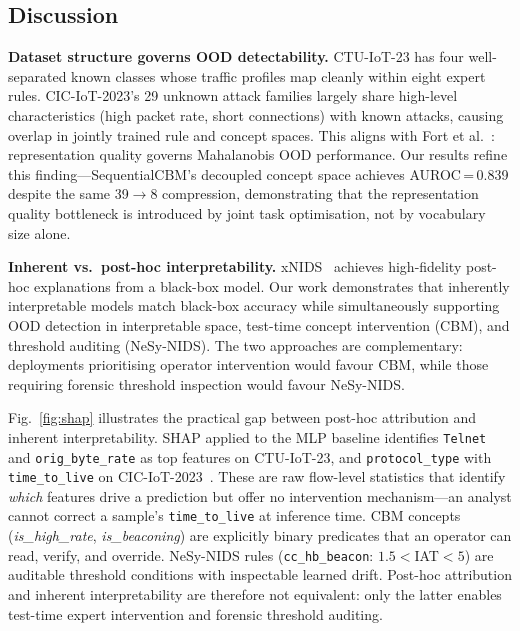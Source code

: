 \documentclass[conference]{IEEEtran}
\begin{document}
\subsection{Discussion}

\textbf{Dataset structure governs OOD detectability.}
CTU-IoT-23 has four well-separated known classes whose traffic profiles
map cleanly within eight expert rules. CIC-IoT-2023's 29 unknown attack
families largely share high-level characteristics (high packet rate,
short connections) with known attacks, causing overlap in jointly
trained rule and concept spaces. This aligns with Fort
et al.~\cite{fort2021exploring}: representation quality governs
Mahalanobis OOD performance. Our results refine this
finding---SequentialCBM's decoupled concept space achieves AUROC\,=\,0.839
despite the same 39$\to$8 compression, demonstrating that the
representation quality bottleneck is introduced by joint task
optimisation, not by vocabulary size alone.

\textbf{Inherent vs.\ post-hoc interpretability.}
xNIDS~\cite{wei2023xnids} achieves high-fidelity post-hoc explanations
from a black-box model. Our work demonstrates that inherently
interpretable models match black-box accuracy while simultaneously
supporting OOD detection in interpretable space, test-time concept
intervention (CBM), and threshold auditing (NeSy-NIDS). The two
approaches are complementary: deployments prioritising operator
intervention would favour CBM, while those requiring forensic threshold
inspection would favour NeSy-NIDS.

\begin{sloppypar}
Fig.~\ref{fig:shap} illustrates the practical gap between post-hoc
attribution and inherent interpretability. SHAP applied to the MLP
baseline identifies \texttt{Telnet} and \texttt{orig\_byte\_rate} as
top features on CTU-IoT-23, and \texttt{protocol\_type} with
\texttt{time\_to\_live} on CIC-IoT-2023~\cite{rudin2019stop}. These
are raw flow-level statistics that identify \emph{which} features
drive a prediction but offer no intervention mechanism---an analyst
cannot correct a sample's \texttt{time\_to\_live} at inference time.
CBM concepts (\textit{is\_high\_rate}, \textit{is\_beaconing}) are
explicitly binary predicates that an operator can read, verify, and
override. NeSy-NIDS rules (\texttt{cc\_hb\_beacon}: $1.5{<}$IAT$<5$)
are auditable threshold conditions with inspectable learned drift.
Post-hoc attribution and inherent interpretability are therefore not
equivalent: only the latter enables test-time expert intervention and
forensic threshold auditing.
\end{sloppypar}
\end{document}
